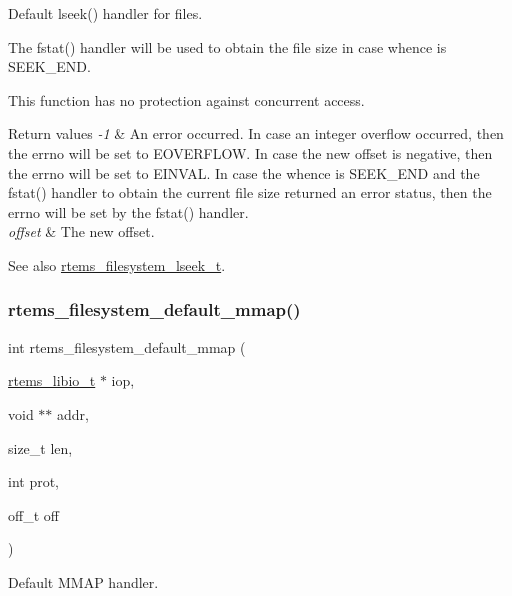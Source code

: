 Default lseek() handler for files. 

The fstat() handler will be used to obtain the file size in case whence is S\+E\+E\+K\+\_\+\+E\+ND.

This function has no protection against concurrent access.


\begin{DoxyRetVals}{Return values}
{\em -\/1} & An error occurred. In case an integer overflow occurred, then the errno will be set to E\+O\+V\+E\+R\+F\+L\+OW. In case the new offset is negative, then the errno will be set to E\+I\+N\+V\+AL. In case the whence is S\+E\+E\+K\+\_\+\+E\+ND and the fstat() handler to obtain the current file size returned an error status, then the errno will be set by the fstat() handler. \\
\hline
{\em offset} & The new offset.\\
\hline
\end{DoxyRetVals}
\begin{DoxySeeAlso}{See also}
\mbox{\hyperlink{group__LibIOFSHandler_gab3752ab0473efced7afee0d60c0e2c58}{rtems\+\_\+filesystem\+\_\+lseek\+\_\+t}}. 
\end{DoxySeeAlso}
\mbox{\label{group__LibIOFSHandler_gac2f7ea9b90b247cee91c3b6b10bf7ba9}} 
\subsubsection{\texorpdfstring{rtems\_filesystem\_default\_mmap()}{rtems\_filesystem\_default\_mmap()}}
{\footnotesize\ttfamily int rtems\+\_\+filesystem\+\_\+default\+\_\+mmap (\begin{DoxyParamCaption}\item[{\mbox{\hyperlink{structrtems__libio__tt}{rtems\+\_\+libio\+\_\+t}} $\ast$}]{iop,  }\item[{void $\ast$$\ast$}]{addr,  }\item[{size\+\_\+t}]{len,  }\item[{int}]{prot,  }\item[{off\+\_\+t}]{off }\end{DoxyParamCaption})}



Default M\+M\+AP handler. 


